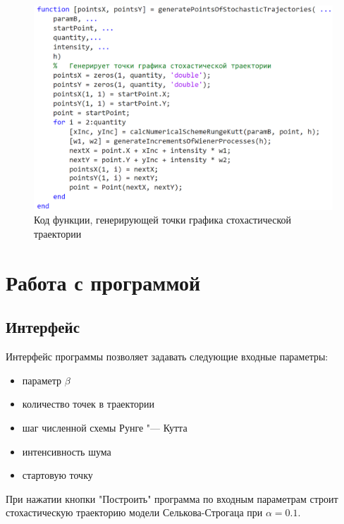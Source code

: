 \documentclass[a4paper, 14pt]{article}
\begin{document}
		\newpage
		
		\begin{figure}[!ht]
			\begin{center}
				\includegraphics[scale=0.35]{img/code_St.png}\caption{Код функции, генерирующей точки графика стохастической траектории}
			\end{center}
		\end{figure}
		
	
	\section{Работа с программой}
	
		\subsection{Интерфейс}
			
			Интерфейс программы позволяет задавать следующие входные параметры:
			
			\begin{itemize}
				\item параметр $\beta$
				\item количество точек в траектории
				\item шаг численной схемы Рунге "--- Кутта
				\item интенсивность шума
				\item стартовую точку
			\end{itemize}
			
			При нажатии кнопки "Построить" программа по входным параметрам строит стохастическую траекторию	модели Селькова-Строгаца при $\alpha = 0.1$.
			
\end{document}
